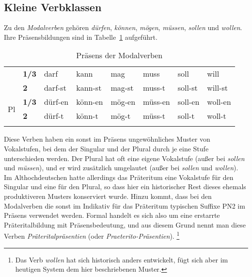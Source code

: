 \subsection{Kleine Verbklassen}
\label{sec:kleineverbklassen}


Zu den \textit{Modalverben} gehören \textit{dürfen}, \textit{können}, \textit{mögen}, \textit{müssen}, \textit{sollen} und \textit{wollen}.
Ihre Präsensbildungen sind in Tabelle~\ref{tab:kleineverbklassen120} aufgeführt.


\begin{table}[!htbp]
  \centering
  \begin{tabular}{llllllll}
    \lsptoprule
    \multirow{2}{*}{\textbf{Sg}} & \textbf{1/3} & darf & kann & mag & muss & soll & will \\
    & \textbf{2} & darf-st & kann-st & mag-st & muss-t & soll-st & will-st \\
    \midrule
    \multirow{2}{*}{Pl} & \textbf{1/3} & dürf-en & könn-en & mög-en & müss-en & soll-en & woll-en \\
    & \textbf{2} & dürf-t & könn-t & mög-t & müss-t & soll-t & woll-t \\
    \lspbottomrule
  \end{tabular}
  \caption{Präsens der Modalverben}
  \label{tab:kleineverbklassen120}
\end{table}

Diese Verben haben ein sonst im Präsens ungewöhnliches Muster von Vokalstufen, bei dem der Singular und der Plural durch je eine Stufe unterschieden werden.
Der Plural hat oft eine eigene Vokalstufe (außer bei \textit{sollen} und \textit{müssen}), und er wird zusätzlich umgelautet (außer bei \textit{sollen} und \textit{wollen}).
Im Althochdeutschen hatte allerdings das Präteritum eine Vokalstufe für den Singular und eine für den Plural, so dass hier ein historischer Rest dieses ehemals produktiveren Musters konserviert wurde.
Hinzu kommt, dass bei den Modalverben die sonst im Indikativ für das Präteritum typischen Suffixe PN2 im Präsens verwendet werden.
Formal handelt es sich also um eine erstarrte Präteritalbildung mit Präsensbedeutung, und aus diesem Grund nennt man diese Verben \textit{Präteritalpräsentien} (oder \textit{Praeterito-Präsentien}).%
\footnote{Das Verb \textit{wollen} hat sich historisch anders entwickelt, fügt sich aber im heutigen System dem hier beschriebenen Muster.}


